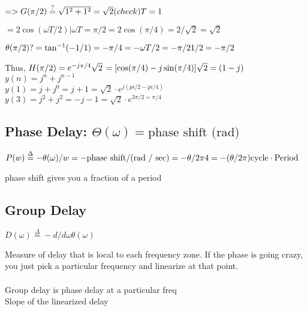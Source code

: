 $=> G(\pi / 2) \stackrel{?}{=} \sqrt{1^2 + 1^2} = \sqrt{2} (check)\\
T = 1$


$= 2\cos(\omega T/2) | \omega T = \pi / 2 = 2 \cos(\pi / 4) = 2 / \sqrt{2} = \sqrt{2}$


$\theta(\pi / 2) ?= \tan^{-1}(-1 / 1) = - \pi / 4 \\
= -\omega T / 2 = -\pi/2 1/2 = - \pi / 2$


Thus, $H(\pi / 2) = e^{-j \pi/4} \sqrt{2} \\$
$
= [\cos(\pi / 4) - j \sin(\pi / 4) ] \sqrt{2} \\
= (1 - j)
$\\

$y(n) = j^n + j^{n - 1}$\\
$y(1) = j + j^0 = j + 1 = \sqrt{2} \cdot e^{j(pi/2 - pi/4)}$\\
$y(3) = j^2 + j^2 = -j - 1 = \sqrt{2} \cdot e^{3\pi / 2 = \pi / 4}$\\

\subsection*{Phase Delay: $\Theta(\omega) = \mbox{phase shift (rad)}$}


$P(w) \stackrel{\Delta}{=}  - \theta(\omega) / w = - \mbox{phase shift} / \mbox{(rad / sec)} \\
    = -\theta / 2 \pi 4 = -(\theta / 2 \pi) \mbox{cycle} \cdot \mbox{Period}$

phase shift gives you a fraction of a period

\subsection*{Group Delay}

$D(\omega) \stackrel{\Delta}{=} -d/d\omega \theta(\omega)$

Measure of delay that is local to each frequency zone. 
If the phase is going crazy, you just pick a particular frequency and linearize
at that point.
\\\\
Group delay is phase delay at a particular freq\\
Slope of the linearized delay
